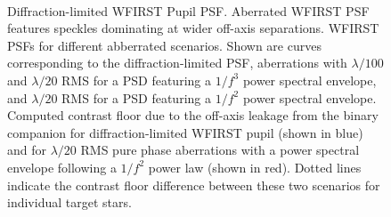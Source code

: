 \documentclass[]{spie}  %
\begin{document}
\begin{figure}[h!]
\centering
{}
\\
\caption[Companion Leakage]
{\label{fig:leakage}    Diffraction-limited WFIRST Pupil PSF.  Aberrated WFIRST PSF features speckles dominating at wider off-axis separations.  WFIRST PSFs for different abberrated scenarios. Shown are curves corresponding to the diffraction-limited PSF, aberrations with $\lambda/100$ and $\lambda/20$ RMS for a PSD featuring a $1/f^{3}$ power spectral envelope, and $\lambda/20$ RMS for a PSD featuring a $1/f^{2}$  power spectral envelope.  Computed contrast floor due to the off-axis leakage from the binary companion for diffraction-limited WFIRST pupil (shown in blue) and for $\lambda/20$ RMS pure phase aberrations with a power spectral envelope following a $1/f^{2}$ power law (shown in red). Dotted lines indicate the contrast floor difference between these two scenarios for individual target stars.}
\end{figure}
\end{document}

